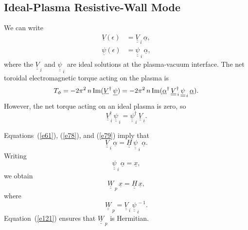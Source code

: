 \documentclass[12pt,prb,aps,notitlepage]{revtex4-1}
\begin{document}
\subsection{Ideal-Plasma Resistive-Wall Mode}
We can write
\begin{align}\label{e78}
\underline{V}(\epsilon)&= \underline{\underline{V}}_{\,i}\,\underline{\alpha},\\[0.5ex]
\underline{\psi}(\epsilon)&= \underline{\underline{\psi}}_{\,i}\,\underline{\alpha},\label{e79}
\end{align}
where the $\underline{\underline{V}}_{\,i}$ and $\underline{\underline{\psi}}_{\,i}$ are ideal solutions at the plasma-vacuum interface.
The net toroidal electromagnetic torque acting on the plasma is
\begin{equation}
T_\phi= -2\pi^2\,n\,{\rm Im}(\underline{V}^\dag\,\underline{\psi})=-2\pi^2\,n\,{\rm Im}(\underline{\alpha}^\dag\,\underline{\underline{V}}_{\,i}^\dag
\,\underline{\underline{\psi}}_{\,i}\,\underline{\alpha}).
\end{equation}
However, the net torque acting on an ideal plasma is zero, so
\begin{equation}\label{e121}
\underline{\underline{V}}_{\,i}^\dag \,\underline{\underline{\psi}}_{\,i}=\underline{\underline{\psi}}_{\,i}^\dag \,\underline{\underline{V}}_{\,i}.
\end{equation}

Equations~(\ref{e61}), (\ref{e78}), and (\ref{e79}) imply that 
\begin{equation}
\underline{\underline{V}}_{\,i}\,\underline{\alpha}=\underline{\underline{H}}\,\underline{\underline{\psi}}_{\,i}\,\underline{\alpha}.
\end{equation}
Writing
\begin{equation}
\underline{\underline{\psi}}_{\,i}\,\underline{\alpha} = \underline{x},
\end{equation}
we obtain
\begin{equation}
\underline{\underline{W}}_{\,p}\,\underline{x}
= \underline{\underline{H}}\,\underline{x},
\end{equation}
where
\begin{equation}\label{e128}
\underline{\underline{W}}_{\,p} = \underline{\underline{V}}_{\,i}\,\underline{\underline{\psi}}_{\,i}^{\,-1}.
\end{equation}
Equation~(\ref{e121}) ensures that $\underline{\underline{W}}_{\,p}$ is Hermitian. 
\end{document}
